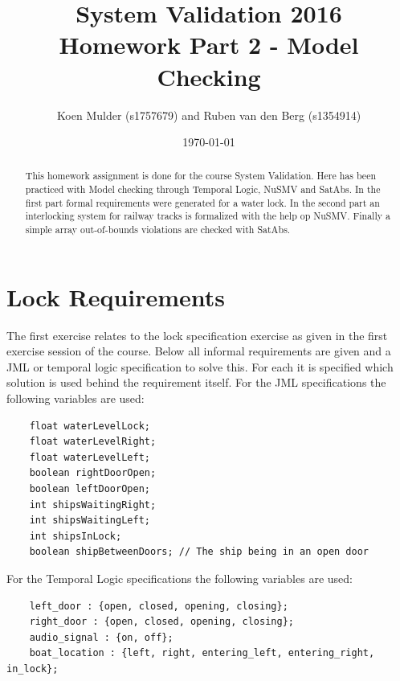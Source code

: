 \documentclass[a4paper]{article}
\title{System Validation 2016 \\ Homework Part 2 - Model Checking}
\author{Koen Mulder (s1757679) and Ruben van den Berg (s1354914)}
\date{\today}
\begin{document}
	\maketitle
	
	\begin{abstract}
		This homework assignment is done for the course System Validation. Here has been practiced with Model checking through Temporal Logic, NuSMV and SatAbs. In the first part formal requirements were generated for a water lock. In the second part an interlocking system for railway tracks is formalized with the help op NuSMV. Finally a simple array out-of-bounds violations are checked with SatAbs. 
	\end{abstract}
	
	\section{Lock Requirements}
	The first exercise relates to the lock specification exercise as given in the first exercise session of the course. Below all informal requirements are given and a JML or temporal logic specification to solve this. For each it is specified which solution is used behind the requirement itself.
	For the JML specifications the following variables are used:
	\begin{lstlisting}
	float waterLevelLock;
	float waterLevelRight;
	float waterLevelLeft;
	boolean rightDoorOpen;
	boolean leftDoorOpen;
	int shipsWaitingRight;
	int shipsWaitingLeft;
	int shipsInLock;
	boolean shipBetweenDoors; // The ship being in an open door
	\end{lstlisting}
	For the Temporal Logic specifications the following variables are used:
	\begin{lstlisting}
	left_door : {open, closed, opening, closing};
	right_door : {open, closed, opening, closing};
	audio_signal : {on, off};
	boat_location : {left, right, entering_left, entering_right, in_lock};
	\end{lstlisting}
\end{document}
